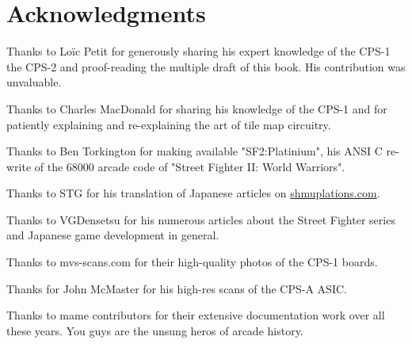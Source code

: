 \chapter*{Acknowledgments} 

Thanks to Lo\"{i}c Petit for generously sharing his expert knowledge of the CPS-1 the CPS-2 and proof-reading the multiple draft of this book. His contribution was unvaluable.

Thanks to Charles MacDonald for sharing his knowledge of the CPS-1 and for patiently explaining and re-explaining the art of tile map circuitry.

Thanks to Ben Torkington for making available "SF2:Platinium", his ANSI C re-write of the 68000 arcade code of "Street Fighter II: World Warriors".

Thanks to STG for his translation of Japanese articles on \href{https://shmuplations.com}{shmuplations.com}.

Thanks to VGDensetsu for his numerous articles about the Street Fighter series and Japanese game development in general.

Thanks to mvs-scans.com for their high-quality photos of the CPS-1 boards.

Thanks for John McMaster for his high-res scans of the CPS-A ASIC.

Thanks to mame contributors for their extensive documentation work over all these years. You guys are the unsung heros of arcade history.